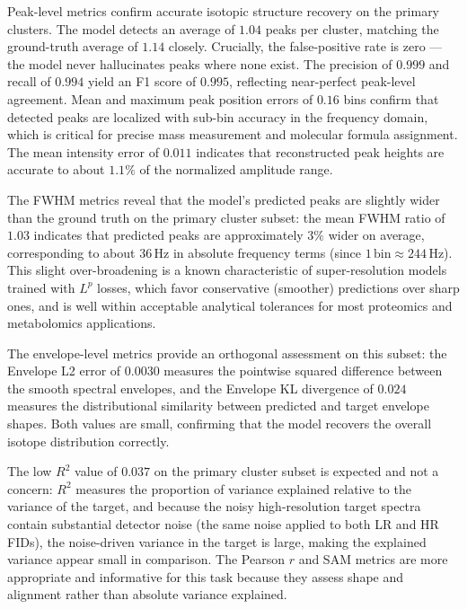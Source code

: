 \documentclass[12pt,a4paper]{report}
\begin{document}
Peak-level metrics confirm accurate isotopic structure recovery on the primary clusters.  The model detects an average of $1.04$ peaks per cluster, matching the ground-truth average of $1.14$ closely.  Crucially, the false-positive rate is zero — the model never hallucinates peaks where none exist.  The precision of $0.999$ and recall of $0.994$ yield an F1 score of $0.995$, reflecting near-perfect peak-level agreement.  Mean and maximum peak position errors of $0.16$ bins confirm that detected peaks are localized with sub-bin accuracy in the frequency domain, which is critical for precise mass measurement and molecular formula assignment.  The mean intensity error of $0.011$ indicates that reconstructed peak heights are accurate to about $1.1\%$ of the normalized amplitude range.

The FWHM metrics reveal that the model's predicted peaks are slightly wider than the ground truth on the primary cluster subset: the mean FWHM ratio of $1.03$ indicates that predicted peaks are approximately $3\%$ wider on average, corresponding to about $36\,$Hz in absolute frequency terms (since $1\,\text{bin} \approx 244\,$Hz).  This slight over-broadening is a known characteristic of super-resolution models trained with $L^p$ losses, which favor conservative (smoother) predictions over sharp ones, and is well within acceptable analytical tolerances for most proteomics and metabolomics applications.

The envelope-level metrics provide an orthogonal assessment on this subset: the Envelope L2 error of $0.0030$ measures the pointwise squared difference between the smooth spectral envelopes, and the Envelope KL divergence of $0.024$ measures the distributional similarity between predicted and target envelope shapes.  Both values are small, confirming that the model recovers the overall isotope distribution correctly.

The low $R^2$ value of $0.037$ on the primary cluster subset is expected and not a concern: $R^2$ measures the proportion of variance explained relative to the variance of the target, and because the noisy high-resolution target spectra contain substantial detector noise (the same noise applied to both LR and HR FIDs), the noise-driven variance in the target is large, making the explained variance appear small in comparison.  The Pearson $r$ and SAM metrics are more appropriate and informative for this task because they assess shape and alignment rather than absolute variance explained.
\end{document}
